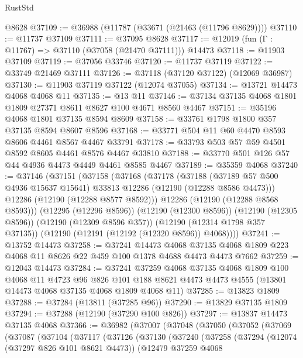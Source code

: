 \begin{lexlean}{RustStd}
\begin{coremodule}
    @8628
@37109 := @36988 (@11787 (@33671 (@21463 (@11796 @8629))))
@37110 := @11737 @37109
@37111 := @37095 @8628
@37117 := @12019 (fun (Γ : @11767) => @37110 (@37058 (@21470 @37111))) @14473
@37118 := @11903 @37109
@37119 := @37056 @33746
@37120 := @11737 @37119
@37122 := @33749 @21469 @37111
@37126 := @37118 (@37120 @37122) (@12069 @36987)
@37130 := @11903 @37119 @37122 (@12074 @37055)
@37134 := @13721 @14473 @4068 @4068 @11
@37135 := @13 @11
@37146 := @37134 @37135 @4068 @1801 @1809 @27371 @8611 @8627 @100 @4671 @8560 @4467
@37151 := @35196 @4068 @1801 @37135 @8594 @8609
@37158 := @33761 @1798 @1800 @357 @37135 @8594 @8607 @8596
@37168 := @33771 @504 @11 @60 @4470 @8593 @8606 @4461 @8567 @4467 @33791
@37178 := @33793 @503 @57 @59 @4501 @8592 @8605 @4461 @8576 @4467 @33810
@37188 := @33770 @501 @126 @57 @44 @4936 @4473 @4449 @4461 @8585 @4467
@37189 := @35359 @4068
@37240 := @37146
    (@37151
      (@37158
        (@37168
          (@37178
            (@37188
              (@37189 @57 @500 @4936 @15637 @15641)
              @33813
              @12286
              (@12190 (@12288 @8586 @4473)))
            @12286
            (@12190 (@12288 @8577 @8592)))
          @12286
          (@12190 (@12288 @8568 @8593)))
        (@12295 (@12296 @8596))
        (@12190 (@12300 @8596))
        (@12190 (@12305 @8596))
        (@12190 (@12309 @8596 @357))
        (@12190 (@12314 @1798 @357 @37135))
        (@12190 (@12191 (@12192 (@12320 @8596)) @4068))))
@37241 := @13752 @14473
@37258 := @37241
    @14473
    @4068
    @37135
    @4068
    @1809
    @223
    @4068
    @11
    @8626
    @22
    @459
    @100
    @1378
    @4688
    @4473
    @4473
    @7662
@37259 := @12043 @14473
@37284 := @37241
    @37259
    @4068
    @37135
    @4068
    @1809
    @100
    @4068
    @11
    @4723
    @96
    @826
    @101
    @188
    @8621
    @4473
    @4473
    @4555
    (@13801 @14473 @4068 @37135 @4068 @1809 @4068 @11)
@37285 := @13823 @1809
@37288 := @37284 (@13811 (@37285 @96))
@37290 := @13829 @37135 @1809
@37294 := @37288 (@12190 (@37290 @100 @826))
@37297 := @13837 @14473 @37135 @4068
@37366 := @36982
    (@37007
      (@37048
        (@37050
          (@37052
            (@37069
              (@37087
                (@37104
                  (@37117
                    (@37126
                      (@37130
                        (@37240
                          (@37258
                            (@37294
                              (@12074 (@37297 @826 @101 @8621 @4473))
                              (@12479
                                @37259
                                @4068

\end{coremodule}
\end{lexlean}
